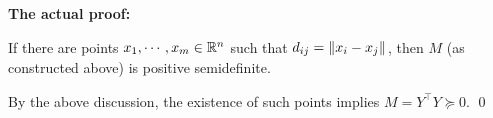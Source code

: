 \begin{enumerate}[leftmargin=*]
\textbf{The actual proof:}


\begin{cl}
If there are points $x_{1},\cdots,x_{m}\in\mathbb{R}^{n}$ such that $d_{ij} = \left\lVert x_{i}-x_{j} \right\rVert_{}$, then $M$ (as constructed above) is positive semidefinite.
\end{cl}
\begin{pf}
By the above discussion, the existence of such points implies $M = Y^{\top}Y\succeq0$. 
\qed\end{pf}


\end{enumerate}
